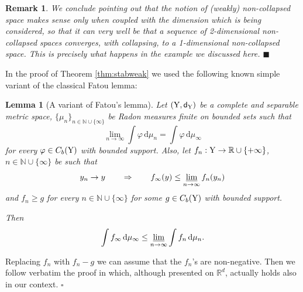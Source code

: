 \documentclass[reqno,11pt]{article}
\numberwithin{equation}{section}
\newcommand{\N}{\mathbb{N}}
\newcommand{\R}{\mathbb{R}}
\newcommand{\sfd}{{\sf d}}
\renewcommand{\d}{{\mathrm d}}
\newcommand{\limi}{\varliminf}
\newcommand{\fr}{\penalty-20\null\hfill$\blacksquare$}                      %
\renewenvironment{proof}{\removelastskip\par\medskip   %
\noindent{\em Proof} \rm}{\penalty-20\null\hfill$\square$\par\medbreak}
\newtheorem{lemma}[theorem]{Lemma}
\newtheorem{remark}[theorem]{Remark}
\newcommand{\Y}{{\rm Y}}
\begin{document}
\begin{remark}
{We conclude pointing out that the notion of (weakly) non-collapsed space makes sense only when coupled with the dimension which is being considered, so that it can very well be that a sequence of 2-dimensional non-collapsed spaces converges, with collapsing, to a 1-dimensional non-collapsed space. This is precisely what happens in the example we discussed here.
}\fr\end{remark}

In the proof of  Theorem \ref{thm:stabweak} we used the following known simple variant of the classical Fatou lemma:
\begin{lemma}[A variant of Fatou's lemma]\label{le:fatou}
Let $(\Y,\sfd_\Y)$ be a complete and separable metric space, $\{\mu_n\}_{n\in\N\cup\{\infty\}}$ be Radon measures finite on bounded sets such that
\[
\lim_{n\to\infty}\int \varphi\,\d\mu_n=\int\varphi\,\d\mu_\infty
\]
for every $\varphi\in C_b(\Y)$ with bounded support. Also, let $f_n:\Y\to\R\cup\{+\infty\}$, $n\in\N\cup\{\infty\}$  be such that 
\begin{equation}
\label{eq:glimi}
y_n\to y\qquad\Rightarrow\qquad f_\infty (y)\leq\limi_{n\to\infty}f_n(y_n)
\end{equation}
and $f_n\geq g$ for every $n\in\N\cup\{\infty\}$ for some $g\in C_b(\Y)$ with bounded support.

Then
\[
\int f_\infty\,\d\mu_\infty\leq\limi_{n\to\infty}\int f_n\,\d\mu_n.
\]
\end{lemma}
\begin{proof}
Replacing $f_n$ with $f_n-g$ we can assume that the $f_n$'s are non-negative. Then we follow verbatim the proof in \cite[Lemma 8.2]{AmbDepKir11} which, although presented on $\R^d$, actually holds also in our context.
\end{proof}
\end{document}
